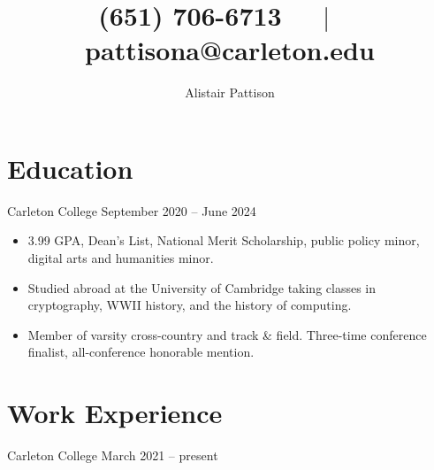 \documentclass{ali-resume}
\author{Alistair Pattison}
\title{
    (651) 706-6713 $\quad\mid\quad$
    {pattisona@carleton.edu}
}
\begin{document}
\maketitle

\section{Education}

{Carleton College}
{September 2020 – June 2024}

\begin{itemize}
	\item 3.99 GPA, Dean's List, National Merit Scholarship, public policy minor, digital arts and humanities minor.
	\item Studied abroad at the University of Cambridge taking classes in cryptography, WWII history, and the history of computing.
	\item Member of varsity cross-country and track \& field. Three-time conference finalist, all-conference honorable mention.
\end{itemize}



\section{Work Experience}



{Carleton College}
{March 2021 – present}
\end{document}
